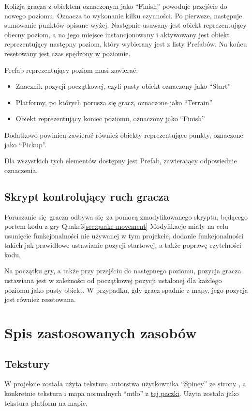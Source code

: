 \documentclass[10pt,a4paper]{article}
\begin{document}
Kolizja gracza z obiektem oznaczonym jako ``Finish'' powoduje przejście do nowego
poziomu. Oznacza to wykonanie kilku czynności. Po pierwsze, następuje sumowanie
punktów opisane wyżej. Następnie usuwany jest obiekt reprezentujący obecny
poziom, a na jego miejsce instancjonowany i aktywowany jest obiekt reprezentujący
następny poziom, który wybierany jest z listy Prefabów. Na końcu resetowany jest
czas spędzony w poziomie.

Prefab reprezentujący poziom musi zawierać:
\begin{itemize}
	\item Znacznik pozycji początkowej, czyli pusty obiekt oznaczony jako ``Start''
	\item Platformy, po których porusza się gracz, oznaczone jako ``Terrain''
	\item Obiekt reprezentujący koniec poziomu, oznaczony jako ``Finish''
\end{itemize}
Dodatkowo powinien zawierać również obiekty reprezentujące punkty, oznaczone
jako ``Pickup''.

Dla wszystkich tych elementów dostępny jest Prefab, zawierający odpowiednie
oznaczenia.

\subsection{Skrypt kontrolujący ruch gracza}

Poruszanie się gracza odbywa się za pomocą zmodyfikowanego skryptu, będącego
portem kodu z gry Quake3\ref{sec:quake-movement}
 Modyfikacje miały na celu usunięcie funkcjonalności nie używanej
w tym projekcie, dodanie funkcjonalności takich jak prawidłowe ustawianie
pozycji startowej, a także poprawę czytelności kodu.

Na początku gry, a także przy przejściu do następnego poziomu, pozycja gracza
ustawiana jest w zależności od początkowej pozycji ustalonej dla każdego poziomu
jako pusty obiekt. W przypadku, gdy gracz spadnie z mapy, jego pozycja jest
również resetowana.

% 

\section{Spis zastosowanych zasobów}
\subsection{Tekstury}
W projekcie została użyta tekstura autorstwa użytkownika ``Spiney'' ze strony
\href{https://opengameart.org}, a konkretnie tekstura i mapa normalnych
``mtl\textunderscore o''
z \href{https://opengameart.org/content/metalstone-textures}{tej paczki}. Użyta
została jako tekstura platform na mapie.
\end{document}
